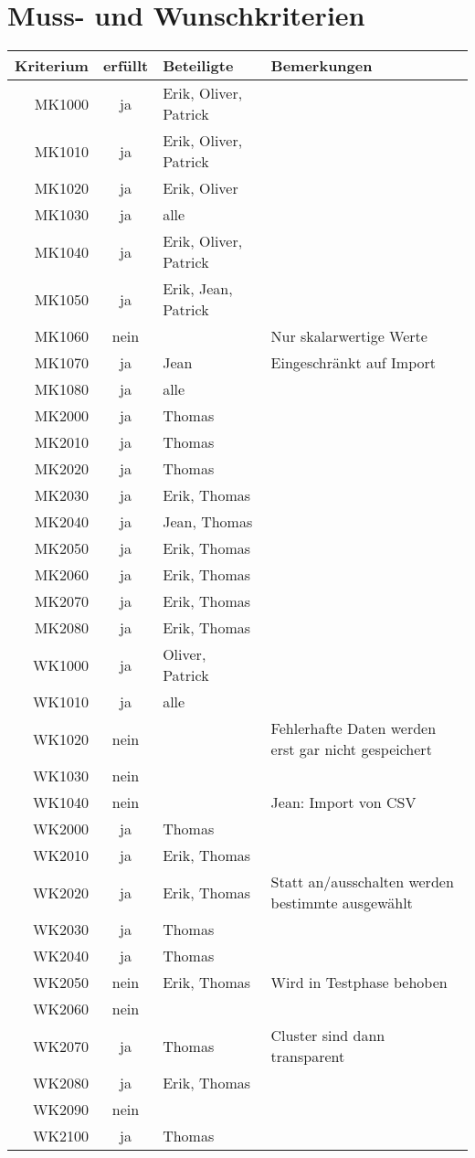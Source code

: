 \chapter{Muss- und Wunschkriterien}
\begin{tabularx}{\linewidth}{r|c|l|X}
	\textbf{Kriterium} & \textbf{erfüllt} & \textbf{Beteiligte} & \textbf{Bemerkungen} \\
	\hline
	MK1000 & ja & Erik, Oliver, Patrick & \\
	MK1010 & ja & Erik, Oliver, Patrick & \\
	MK1020 & ja & Erik, Oliver & \\
	MK1030 & ja & alle & \\
	MK1040 & ja & Erik, Oliver, Patrick & \\
	MK1050 & ja & Erik, Jean, Patrick & \\
	MK1060 & nein &  & Nur skalarwertige Werte\\
	MK1070 & ja & Jean & Eingeschränkt auf Import\\
	MK1080 & ja & alle & \\
	MK2000 & ja & Thomas & \\
	MK2010 & ja & Thomas & \\
	MK2020 & ja & Thomas & \\
	MK2030 & ja & Erik, Thomas & \\
	MK2040 & ja & Jean, Thomas & \\
	MK2050 & ja & Erik, Thomas & \\
	MK2060 & ja & Erik, Thomas & \\
	MK2070 & ja & Erik, Thomas & \\
	MK2080 & ja & Erik, Thomas & \\
	\hline\hline
	WK1000 & ja & Oliver, Patrick & \\
	WK1010 & ja & alle & \\
	WK1020 & nein &  & Fehlerhafte Daten werden erst gar nicht gespeichert\\
	WK1030 & nein &  & \\
	WK1040 & nein &  & Jean: Import von CSV\\
	WK2000 & ja & Thomas & \\
	WK2010 & ja & Erik, Thomas & \\
	WK2020 & ja & Erik, Thomas & Statt an/ausschalten werden bestimmte ausgewählt\\
	WK2030 & ja & Thomas & \\
	WK2040 & ja & Thomas & \\
	WK2050 & nein & Erik, Thomas & Wird in Testphase behoben\\
	WK2060 & nein &  & \\
	WK2070 & ja & Thomas & Cluster sind dann transparent\\
	WK2080 & ja & Erik, Thomas & \\
	WK2090 & nein &  & \\
	WK2100 & ja & Thomas & \\
	
\end{tabularx}